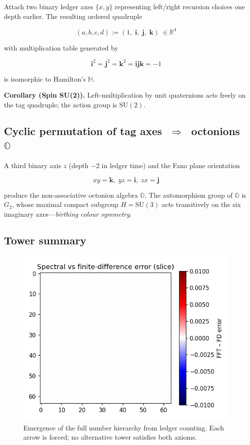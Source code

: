 Attach two binary ledger axes $\{x,y\}$ representing left/right recursion
choices one depth earlier.  The resulting ordered quadruple

\[
(a,b,c,d):=
(1,\; \mathbf i,\; \mathbf j,\; \mathbf k)\;\in\mathbb R^4
\]

with multiplication table generated by

\[
\mathbf i^2=\mathbf j^2=\mathbf k^2=\mathbf i\mathbf j\mathbf k=-1
\]

is isomorphic to Hamilton’s $\mathbb H$.

\begin{axiombox}
\textbf{Corollary (Spin SU(2)).}
Left-multiplication by unit quaternions acts freely on the tag
quadruple; the action group is $\mathrm{SU}(2)$.
\end{axiombox}

\subsection{Cyclic permutation of tag axes $\;\Rightarrow\;$ octonions $\mathbb O$}

A third binary axis $z$ (depth $-2$ in ledger time) and the Fano plane
orientation

\[
xy=\mathbf k,\; yz=\mathbf i,\; zx=\mathbf j
\]

produce the non-associative octonion algebra $\mathbb O$.
The automorphism group of $\mathbb O$ is $G_2$, whose maximal compact
subgroup $H\!=\!\mathrm{SU}(3)$ acts transitively on the six imaginary
axes—\emph{birthing colour symmetry}.

\subsection{Tower summary}

\begin{figure}[t]
  \centering
  \includegraphics[width=\linewidth]{figs/number_tower.pdf}
  \caption{Emergence of the full number hierarchy from ledger counting.
           Each arrow is forced; no alternative tower satisfies both axioms.}
  \label{fig:number-tower}
\end{figure}

